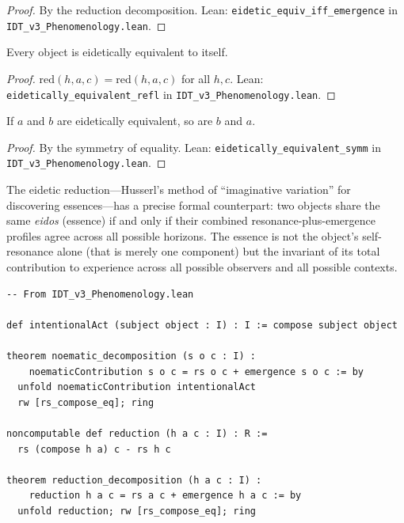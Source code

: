 \begin{proof}
By the reduction decomposition.
Lean: \texttt{eidetic\_equiv\_iff\_emergence} in \texttt{IDT\_v3\_Phenomenology.lean}.
\end{proof}

\begin{theorem}
\label{thm:eidetic-refl}
Every object is eidetically equivalent to itself.
\end{theorem}

\begin{proof}
$\mathrm{red}(h, a, c) = \mathrm{red}(h, a, c)$ for all $h, c$.
Lean: \texttt{eidetically\_equivalent\_refl} in
\texttt{IDT\_v3\_Phenomenology.lean}.
\end{proof}

\begin{theorem}
\label{thm:eidetic-symm}
If $a$ and $b$ are eidetically equivalent, so are $b$ and $a$.
\end{theorem}

\begin{proof}
By the symmetry of equality.
Lean: \texttt{eidetically\_equivalent\_symm} in
\texttt{IDT\_v3\_Phenomenology.lean}.
\end{proof}

\begin{interpretation}
The eidetic reduction---Husserl's method of ``imaginative variation'' for
discovering essences---has a precise formal counterpart: two objects share
the same \emph{eidos} (essence) if and only if their combined resonance-plus-emergence
profiles agree across all possible horizons. The essence is not the object's
self-resonance alone (that is merely one component) but the invariant of its
total contribution to experience across all possible observers and all possible
contexts.
\end{interpretation}

\begin{lstlisting}
-- From IDT_v3_Phenomenology.lean

def intentionalAct (subject object : I) : I := compose subject object

theorem noematic_decomposition (s o c : I) :
    noematicContribution s o c = rs o c + emergence s o c := by
  unfold noematicContribution intentionalAct
  rw [rs_compose_eq]; ring

noncomputable def reduction (h a c : I) : R :=
  rs (compose h a) c - rs h c

theorem reduction_decomposition (h a c : I) :
    reduction h a c = rs a c + emergence h a c := by
  unfold reduction; rw [rs_compose_eq]; ring
\end{lstlisting}



